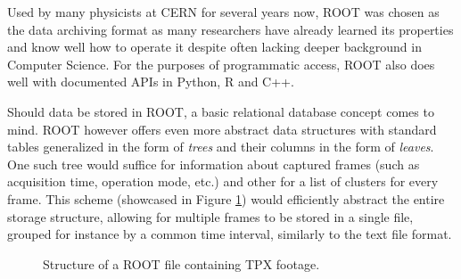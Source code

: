 
Used by many physicists at CERN for several years now, ROOT was chosen as the data archiving format as many researchers have already learned its properties and know well how to operate it despite often lacking deeper background in Computer Science. For the purposes of programmatic access, ROOT also does well with documented APIs in Python, R and C++.

Should data be stored in ROOT, a basic relational database concept comes to mind. ROOT however offers even more abstract data structures with standard tables generalized in the form of \textit{trees} and their columns in the form of \textit{leaves}. One such tree would suffice for information about captured frames (such as acquisition time, operation mode, etc.) and other for a list of clusters for every frame. This scheme (showcased in Figure \ref{fig:root-trees}) would efficiently abstract the entire storage structure, allowing for multiple frames to be stored in a single file, grouped for instance by a common time interval, similarly to the text file format.

\begin{figure}[t]
\begin{center}


\caption{Structure of a ROOT file containing TPX footage.}
\label{fig:root-trees}
\end{center}
\end{figure}

